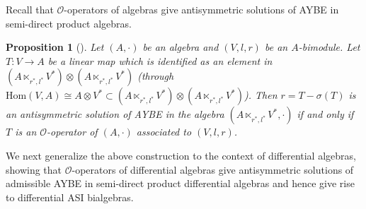 \documentclass[10pt,a4paper]{amsart}
\numberwithin{equation}{section}
\newtheorem{Proposition}[Theorem]{Proposition}
{ \theoremstyle{definition}
	\newtheorem{Definition}[Theorem]{Definition}
	\newtheorem{Note}[Theorem]{Note}
	\newtheorem{Example}[Theorem]{Example}
	\newtheorem{Remark}[Theorem]{Remark} }
\newcommand{\Hom}{\mathrm{Hom}}
\begin{document}
Recall that $\mathcal{O}$-operators of algebras give antisymmetric
solutions of AYBE in semi-direct product algebras.

\begin{Proposition}[{\cite[Corollary~3.10]{Bai2013O}}]\label{pro:O-cons}
 Let $(A, \cdot)$ be an algebra and $(V, l, r)$ be an $A$-bimodule.
 Let $T\colon V \to A$ be a linear map which is identified as an element in $(A \ltimes_{r^*, l^*} V^*) \otimes(A \ltimes_{r^*, l^*} V^*)$
 (through $\Hom(V, A) \cong A \otimes V^* \subset (A \ltimes_{r^*, l^*} V^*) \otimes (A \ltimes_{r^*, l^*} V^*)$).
 Then $r = T - \sigma(T)$ is an antisymmetric solution of AYBE in the algebra $(A \ltimes_{r^*, l^*}V^*, \cdot)$ if and only if $T$ is an $\mathcal{O}$-operator of $(A, \cdot)$ associated to $(V, l, r)$.
\end{Proposition}

We next generalize the above construction to the context of differential algebras,
showing that $\mathcal{O}$-operators of differential algebras give antisymmetric solutions of admissible AYBE in semi-direct product differential algebras and hence give rise to differential ASI bialgebras.
\end{document}
